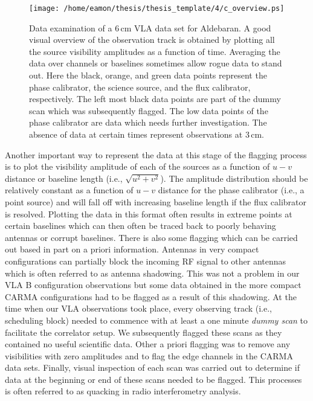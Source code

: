 \begin{figure}[hbt!]
\centering 
\texttt{[image: /home/eamon/thesis/thesis\_template/4/c\_overview.ps]}  
\caption[Data examination of a VLA data set.]{Data examination of a 6\,cm VLA data set for Aldebaran. A good visual overview of the observation track is obtained by plotting all the source visibility amplitudes as a function of time. Averaging the data over channels or baselines sometimes allow rogue data to stand out. Here the black, orange, and green data points represent the phase calibrator, the science source, and the flux calibrator, respectively. The left most black data points are part of the dummy scan which was subsequently flagged. The low data points of the phase calibrator are data which needs further investigation. The absence of data at certain times represent observations at 3\,cm.}
\label{fig:4.2}
\end{figure}

Another important way to represent the data at this stage of the flagging process is to plot the visibility amplitude of each of the sources as a function of $u-v$ distance or baseline length (i.e., $\sqrt{u^2 + v^2}$). The amplitude distribution should be relatively constant as a function of $u-v$ distance for the phase calibrator (i.e., a point source) and will fall off with increasing baseline length if the flux calibrator is resolved. Plotting the data in this format often results in extreme points at certain baselines which can then often be traced back to poorly behaving antennas or corrupt baselines. There is also some flagging which can be carried out based in part on a priori information. Antennas in very compact configurations can partially block the incoming RF signal to other antennas which is often referred to as antenna shadowing. This was not a problem in our VLA B configuration observations but some data obtained in the more compact CARMA configurations had to be flagged as a result of this shadowing. At the time when our VLA observations took place, every observing track (i.e., scheduling block) needed to commence with at least a one minute \textit{dummy scan} to facilitate the correlator setup. We subsequently flagged these scans as they contained no useful scientific data. Other a priori flagging was to remove any visibilities with zero amplitudes and to flag the edge channels in the CARMA data sets. Finally, visual inspection of each scan was carried out to determine if data at the beginning or end of these scans needed to be flagged. This processes is often referred to as quacking in radio interferometry analysis.


